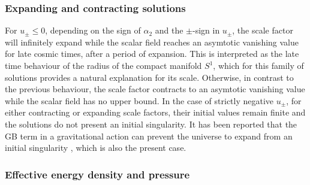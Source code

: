 \documentclass[aps,prd,12pt,superscriptaddress,showpacs,showkeys,longbibliography,reprint,nofootinbib]{revtex4-1}
\begin{document}
\subsubsection{Expanding and contracting solutions}

For $u_\pm\leq 0$, depending on the sign of $\alpha_2$ and the $\pm$-sign in $u_\pm$, the scale factor will infinitely expand while the scalar field reaches an asymtotic vanishing value for late cosmic times, after a period of expansion. This is interpreted as the late time behaviour of the radius of the compact manifold $S^1$, which for this family of solutions provides a natural explanation for its scale. Otherwise, in contrast to the previous behaviour, the scale factor contracts to an asymtotic vanishing value while the scalar field has no upper bound. In the case of strictly negative $u_\pm$, for either contracting or expanding scale factors, their initial values remain finite and the solutions do not present an initial singularity. It has been reported that the GB term in a gravitational action can prevent the universe to expand from an initial singularity \cite{Deruelle:1986iv,Henriques:1986jw,Ishihara:1986if}, which is also the present case. 

\subsubsection{Effective energy density and pressure}
\end{document}
